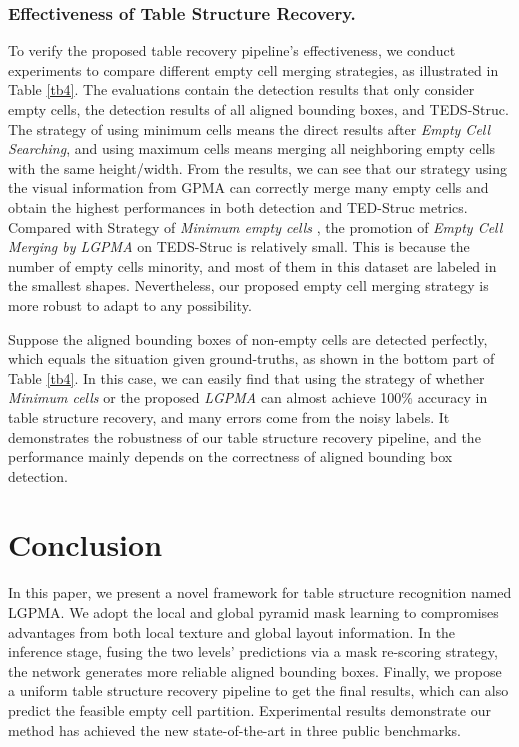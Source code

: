 \documentclass[runningheads]{llncs}
\begin{document}
\subsubsection{Effectiveness of Table Structure Recovery.}
To verify the proposed table recovery pipeline's effectiveness, we conduct experiments to compare different empty cell merging strategies, as illustrated in Table \ref{tb4}. The evaluations contain the detection results that only consider empty cells, the detection results of all aligned bounding boxes, and TEDS-Struc. The strategy of using minimum cells means the direct results after \emph{Empty Cell Searching}, and using maximum cells means merging all neighboring empty cells with the same height/width. From the results, we can see that our strategy using the visual information from GPMA can correctly merge many empty cells and obtain the highest performances in both detection and TED-Struc metrics. Compared with Strategy of \emph{Minimum empty cells }, the promotion of \emph{Empty Cell Merging by LGPMA} on TEDS-Struc is relatively small. This is because the number of empty cells minority, and most of them in this dataset are labeled in the smallest shapes. Nevertheless, our proposed empty cell merging strategy is more robust to adapt to any possibility.

Suppose the aligned bounding boxes of non-empty cells are detected perfectly, which equals the situation given ground-truths, as shown in the bottom part of Table \ref{tb4}. In this case, we can easily find that using the strategy of whether \emph{Minimum cells} or the proposed \emph{LGPMA} can almost achieve 100\% accuracy in table structure recovery, and many errors come from the noisy labels. It demonstrates the robustness of our table structure recovery pipeline, and the performance mainly depends on the correctness of aligned bounding box detection.

\section{Conclusion}
\label{conclusion}
In this paper, we present a novel framework for table structure recognition named LGPMA. We adopt the local and global pyramid mask learning to compromises advantages from both local texture and global layout information. In the inference stage, fusing the two levels' predictions via a mask re-scoring strategy, the network generates more reliable aligned bounding boxes.
Finally, we propose a uniform table structure recovery pipeline to get the final results, which can also predict the feasible empty cell partition. Experimental results demonstrate our method has achieved the new state-of-the-art in three public benchmarks.



\end{document}
